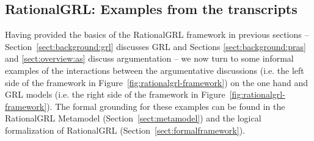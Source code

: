 \begin{itemize}
\end{itemize}



\subsection{RationalGRL: Examples from the transcripts}
Having provided the basics of the RationalGRL framework in previous sections -- Section~\ref{sect:background:grl} discusses GRL and Sections \ref{sect:background:pras} and \ref{sect:overview:as} discuss argumentation -- we now turn to some informal examples of the interactions between the argumentative discussions (i.e. the left side of the framework in Figure~\ref{fig:rationalgrl-framework}) on the one hand and GRL models (i.e. the right side of the framework in Figure~\ref{fig:rationalgrl-framework}). The formal grounding for these examples can be found in the RationalGRL Metamodel (Section~\ref{sect:metamodel}) and the logical formalization of RationalGRL (Section~\ref{sect:formalframework}).

